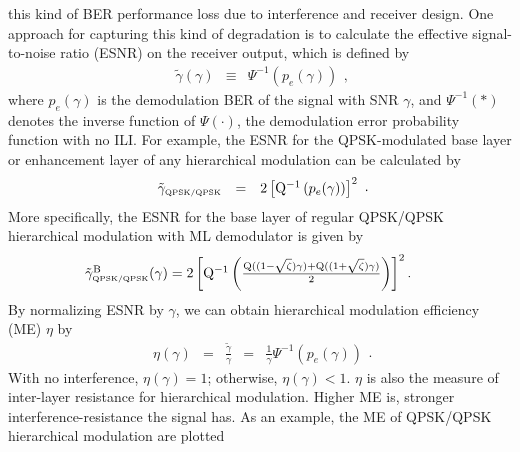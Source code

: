 \documentclass[10pt,fleqn, twocolumn]{IEEEtran}
\begin{document}
this kind of BER performance loss due to interference and receiver
design. One approach for capturing this kind of degradation is to
calculate the effective signal-to-noise ratio (ESNR) on the
receiver output, which is defined by
\begin{equation}
\begin{array}{rcl}
\tilde{\gamma}\left(\gamma\right)&\equiv&\Psi^{-1}\left(p_{e}(\gamma)\right)
\end{array},\label{eff_SNR}
\end{equation}
\noindent where $p_{e}(\gamma)$ is the demodulation BER of the
signal with SNR $\gamma$, and $\Psi^{-1}\left(\ast\right)$ denotes
the inverse function of $\Psi\left(\cdot\right)$, the demodulation
error probability function with no ILI. For example, the ESNR for
the QPSK-modulated base layer or enhancement layer of any
hierarchical modulation can be calculated by
\begin{equation}
\begin{array}{rcl}
\tilde{\gamma}_{\mbox{\tiny QPSK/QPSK}}&=&2\left[{\rm
Q}^{-1}\left(p_{e}(\gamma)\right)\right]^2
\end{array}.\label{eff_SNR_QPSK}
\end{equation}
\noindent More specifically, the ESNR for the base layer of
regular QPSK/QPSK hierarchical modulation with ML demodulator is
given by
\begin{equation}\hspace{-0.225in}
\begin{array}{l}
\tilde{\gamma}_{\mbox{\tiny QPSK/QPSK}}^{\rm
B}(\gamma)=2\left[{\rm Q}^{-1}\left(\frac{{\rm
Q}((1-\sqrt{\zeta})\gamma)+{\rm
Q}((1+\sqrt{\zeta})\gamma)}{2}\right)\right]^2.
\end{array}\label{eff_SNR_QPSK_QPSK}
\end{equation}
\noindent By normalizing ESNR by $\gamma$, we can obtain
hierarchical modulation efficiency (ME) $\eta$ by
\begin{equation}
\begin{array}{rcccl}
\eta\left(\gamma\right)&=&\frac{\tilde{\gamma}}{\gamma}&=&\frac{1}{\gamma}\Psi^{-1}\left(p_{e}(\gamma)\right)
\end{array}.\label{mod_eff}
\end{equation}
\noindent With no interference, $\eta\left(\gamma\right)=1$;
otherwise, $\eta\left(\gamma\right)<1$. $\eta$ is also the measure
of inter-layer resistance for hierarchical modulation. Higher ME
is, stronger interference-resistance the signal has. As an
example, the ME of QPSK/QPSK hierarchical modulation are plotted
\end{document}
